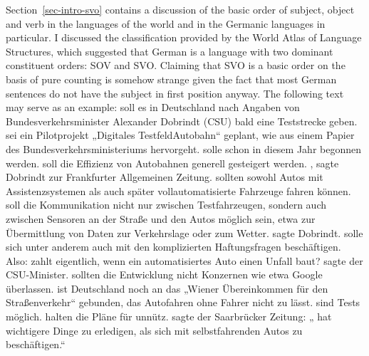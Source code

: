 Section~\ref{sec-intro-svo} contains a discussion of the basic order of subject, object and verb in the languages
of the world and in the Germanic languages in particular. I discussed the classification provided by
the World Atlas of Language Structures, which suggested that German is a language with two dominant
constituent orders: SOV and SVO. Claiming that SVO is a basic order on the basis of pure counting is somehow strange given the
fact that most German sentences do not have the subject in first position anyway. The following text
may serve as an example:
\eanoraggedright
{} soll es in Deutschland nach Angaben von Bundes\-ver\-kehrs\-mi\-nis\-ter
Alexander Dobrindt (CSU) bald eine Teststrecke geben.  sei
ein Pilotprojekt „Digitales TestfeldAutobahn“ geplant, wie aus einem Papier des
Bundesverkehrsministeriums hervorgeht. 
solle schon in diesem Jahr begonnen werden.  soll die Effizienz von
Autobahnen generell gesteigert werden. , sagte Dobrindt zur Frankfurter
Allgemeinen Zeitung.   sollten sowohl Autos mit Assistenzsystemen als auch
später vollautomatisierte Fahrzeuge fahren können.  soll die Kommunikation nicht nur
zwischen Testfahrzeugen, sondern auch zwi\-schen Sensoren an der Straße und den Autos möglich sein,
etwa zur Übermittlung von Daten zur Verkehrslage oder zum Wetter.  sagte Dobrindt.  solle sich unter anderem auch mit den
komplizierten Haftungsfragen beschäftigen.  Also:  zahlt eigentlich, wenn ein
automatisiertes Auto einen Unfall baut?   sagte der
CSU-Minister.  sollten die Entwicklung nicht Konzernen wie etwa
Google überlassen.   ist Deutschland noch an das „Wiener Über\-ein\-kom\-men für den
Straßenverkehr“ gebunden, das Autofahren ohne Fahrer nicht zu lässt.  sind Tests möglich.   halten die Pläne für
unnütz.  sagte der Saarbrücker Zeitung: „ hat wichtigere Dinge zu erledigen, als sich mit selbstfahrenden Autos zu beschäftigen.“
